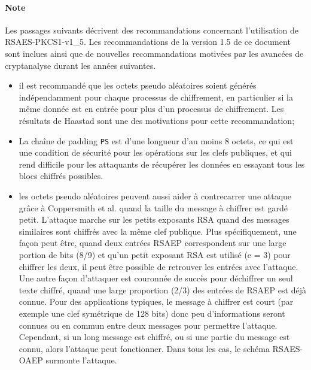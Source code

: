 \paragraph{Note} Les passages suivants décrivent des recommandations concernant l'utilisation de RSAES-PKCS1-v1\_5. Les recommandations de la version 1.5 de ce document sont inclues ainsi que de nouvelles recommandations motivées par les avancées de cryptanalyse durant les années suivantes.
\begin{itemize}
\item il est recommandé que les octets pseudo aléatoires soient générés indépendamment pour chaque processus de chiffrement, en particulier si la même donnée est en entrée pour plus d'un processus de chiffrement. Les résultats de Haastad sont une des motivations pour cette recommandation;
\item La chaîne de padding \texttt{PS} est d'une longueur d'au moins 8 octets, ce qui est une condition de sécurité pour les opérations sur les clefs publiques, et qui rend difficile pour les attaquants de récupérer les données en essayant tous les blocs chiffrés possibles.
\item les octets pseudo aléatoires peuvent aussi aider à contrecarrer une attaque grâce à Coppersmith et al. quand la taille du message à chiffrer est gardé petit. L'attaque marche sur les petits exposants RSA quand des messages similaires sont chiffrés avec la même clef publique. Plus spécifiquement, une façon peut être, quand deux entrées RSAEP correspondent sur une large portion de bits (8/9) et qu'un petit exposant RSA est utilisé (e = 3) pour chiffrer les deux, il peut être possible de retrouver les entrées avec l'attaque. Une autre façon d'attaquer est couronnée de succès pour déchiffrer un seul texte chiffré, quand une large proportion (2/3) des entrées de RSAEP est déjà connue. Pour des applications typiques, le message à chiffrer est court (par exemple une clef symétrique de 128 bits) donc peu d'informations seront connues ou en commun entre deux messages pour permettre l'attaque. Cependant, si un long message est chiffré, ou si une partie du message est connu, alors l'attaque peut fonctionner. Dans tous les cas, le schéma RSAES-OAEP surmonte l'attaque.\\
\end{itemize}

